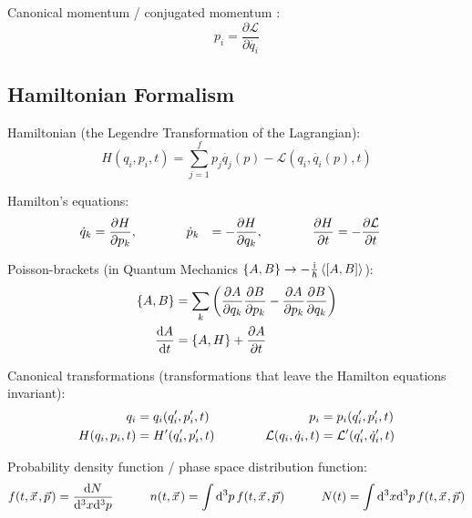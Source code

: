 		\noindent
		Canonical momentum / conjugated momentum :
		\begin{equation}
			p_i=\frac{\partial \mathcal{L}}{\partial\dot{q_i}}
		\end{equation}

	\subsection{Hamiltonian Formalism}
		\noindent
		Hamiltonian (\ie the Legendre Transformation of the Lagrangian):
		\begin{equation}
			H(q_i,p_i,t)=\sum_{j=1}^{f}p_j\dot{q_j}(p) - \mathcal{L}(q_i, \dot{q_i}(p),t)
		\end{equation}

		\noindent
		Hamilton's equations:
		\begin{equation}
			\begin{aligned}
				\dot{q}_k &= \pdv{H}{p_k}, &&\hspace{30pt}
				\dot{p}_k &= -\pdv{H}{q_k}, &&\hspace{30pt}
				\pdv{H}{t} &= -\pdv{\mathcal{L}}{t}
			\end{aligned}
		\end{equation}

		\noindent
		Poisson-brackets (in Quantum Mechanics $\qty{A,B} \to -\frac{\i}{\hbar}\Avg{\comm{A}{B}}$):
		\begin{equation}
			\begin{aligned}
				\qty{A,B} &= \sum_k \left(
				\pdv{A}{q_k}\pdv{B}{p_k} - \pdv{A}{p_k}\pdv{B}{q_k}
				\right) \\
				\dv{A}{t} &= \qty{A, H} + \pdv{A}{t}
			\end{aligned}
		\end{equation}

		\noindent
		Canonical transformations (transformations that leave the Hamilton equations invariant):
		\begin{equation}
			\begin{aligned}
				q_i &= q_i(q_i',p_i',t) &\hspace{30pt}
				p_i &= p_i(q_i',p_i',t) \\
				H(q_i,p_i,t) &= H'(q_i',p_i',t) &\hspace{30pt}
				\mathcal{L}(q_i,\dot{q}_i,t) &= \mathcal{L}'(q_i',\dot{q}_i',t) \\
			\end{aligned}
		\end{equation}

		Probability density function / phase space distribution function:
		\begin{equation}
			f(t,\vec{x},\vec{p}) = \frac{\dd N}{\dd^3 x \dd^3 p}
			\hsp
			n(t,\vec{x}) = \int \dd^3 p\, f(t,\vec{x},\vec{p})
			\hsp
			N(t) = \int \dd^3 x \dd^3 p\, f(t,\vec{x},\vec{p})
		\end{equation}

